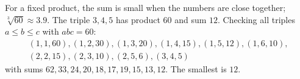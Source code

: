For a fixed product, the sum is small when the numbers are close together; $\sqrt[3]{60}\approx3.9$. The triple $3,4,5$ has product $60$ and sum $12$. Checking all triples $a\le b\le c$ with $abc=60$:
\[
\begin{array}{c}
(1,1,60),(1,2,30),(1,3,20),(1,4,15),(1,5,12),(1,6,10),\\
(2,2,15),(2,3,10),(2,5,6),(3,4,5)
\end{array}
\]
with sums $62,33,24,20,18,17,19,15,13,12$. The smallest is $\boxed{12}$.
